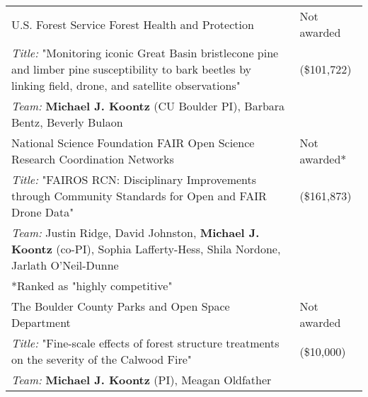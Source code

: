 \begin{longtable}{@{}>{\raggedright}p{5.25in} @{} >{\raggedleft}X@{}}

U.S. Forest Service Forest Health and Protection & Not awarded \tabularnewline
\addtolength{\leftskip}{5ex}\emph{Title:} "Monitoring iconic Great Basin bristlecone pine and limber pine susceptibility to bark beetles by linking field, drone, and satellite observations" & (\$101,722) \tabularnewline
\addtolength{\leftskip}{5ex}\emph{Team:} \textbf{Michael J. Koontz} (CU Boulder PI), Barbara Bentz, Beverly Bulaon & \tabularnewline

National Science Foundation FAIR Open Science Research Coordination Networks & Not awarded* \tabularnewline
\addtolength{\leftskip}{5ex}\emph{Title:} "FAIROS RCN: Disciplinary Improvements through Community Standards for Open and FAIR Drone Data" & (\$161,873) \tabularnewline
\addtolength{\leftskip}{5ex}\emph{Team:} Justin Ridge, David Johnston, \textbf{Michael J. Koontz} (co-PI), Sophia Lafferty-Hess, Shila Nordone, Jarlath O'Neil-Dunne \tabularnewline
\addtolength{\leftskip}{5ex} *Ranked as "highly competitive" & \tabularnewline

The Boulder County Parks and Open Space Department & Not awarded \tabularnewline
\addtolength{\leftskip}{5ex}\emph{Title:} "Fine-scale effects of forest structure treatments on the severity of the Calwood Fire" & (\$10,000) \tabularnewline
\addtolength{\leftskip}{5ex}\emph{Team:} \textbf{Michael J. Koontz} (PI), Meagan Oldfather & \tabularnewline

\end{longtable}
